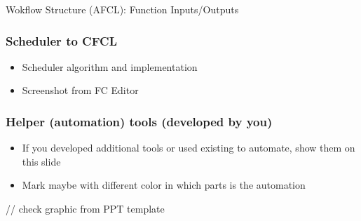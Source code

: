 \documentclass[11pt,t,usepdftitle=false,aspectratio=169]{beamer}
\begin{document}
\begin{frame}{Wokflow Structure (AFCL): Function Inputs/Outputs}
\end{frame}

\begin{frame}
\frametitle{Scheduler to CFCL}
    \begin{itemize}
        \item Scheduler algorithm and implementation
        \item Screenshot from FC Editor
    \end{itemize}
\end{frame}

\begin{frame}
\frametitle{Helper (automation) tools (developed by you)}
    \begin{itemize}
        \item If you developed additional tools or used existing to automate, show them on this slide
        \item Mark maybe with different color in which parts is the automation
    \end{itemize}
    \vspace{1cm}
    // check graphic from PPT template
\end{frame}
\end{document}
